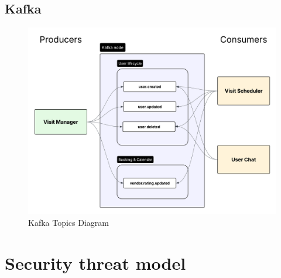 \documentclass[11pt,a4paper]{article}
\begin{document}
\subsection{Kafka}

\begin{figure}[H]
  \centering
  \includegraphics[width=\textwidth]{H4H_Kafka.png}
  \caption{Kafka Topics Diagram}
  \label{fig:kafka-topics-diagram}
\end{figure}

\section{Security threat model}
\end{document}
